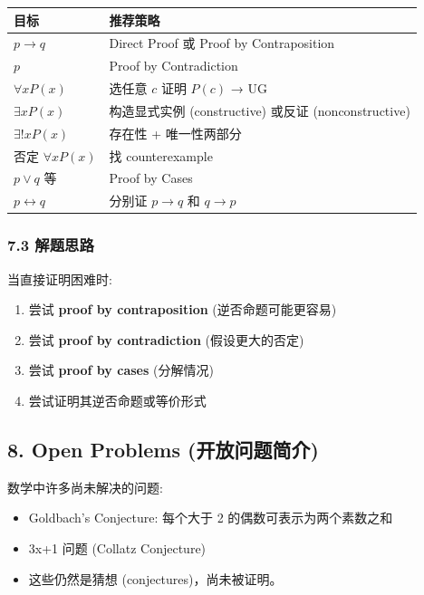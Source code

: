 \documentclass[10pt,a4paper,openany]{ctexbook}
\theoremstyle{definition}
\theoremstyle{remark}
\begin{document}
\begin{center}
\begin{tabular}{ll}
\hline
目标 & 推荐策略 \\ \hline
$p \to q$ & Direct Proof 或 Proof by Contraposition \\
$p$ & Proof by Contradiction \\
$\forall x P(x)$ & 选任意 $c$ 证明 $P(c)$ → UG \\
$\exists x P(x)$ & 构造显式实例 (constructive) 或反证 (nonconstructive) \\
$\exists! x P(x)$ & 存在性 + 唯一性两部分 \\
否定 $\forall x P(x)$ & 找 counterexample \\
$p \lor q$ 等 & Proof by Cases \\
$p \leftrightarrow q$ & 分别证 $p \to q$ 和 $q \to p$ \\
\hline
\end{tabular}

\end{center}

\subsubsection{7.3 解题思路}

当直接证明困难时:
\begin{enumerate}
\item 尝试 \textbf{proof by contraposition} (逆否命题可能更容易)
\item 尝试 \textbf{proof by contradiction} (假设更大的否定)
\item 尝试 \textbf{proof by cases} (分解情况)
\item 尝试证明其逆否命题或等价形式

\end{enumerate}

\vspace{-2pt}

\subsection{8. Open Problems (开放问题简介)}

数学中许多尚未解决的问题:
\begin{itemize}
\item Goldbach's Conjecture: 每个大于 2 的偶数可表示为两个素数之和
\item 3x+1 问题 (Collatz Conjecture)
\item 这些仍然是猜想 (conjectures)，尚未被证明。

\end{itemize}
\end{document}
